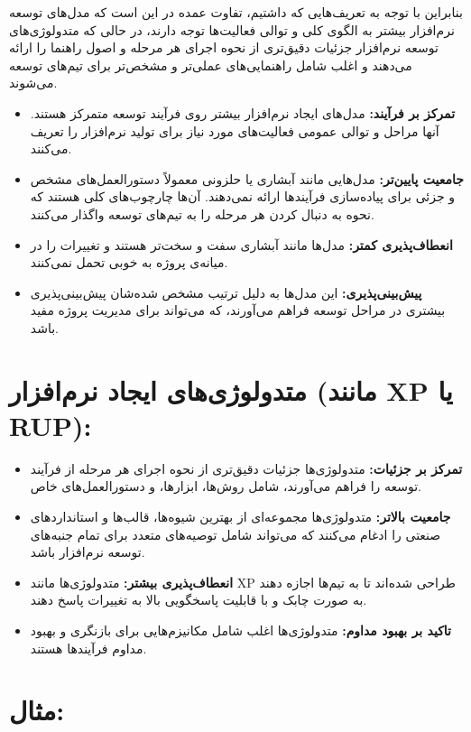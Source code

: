بنابراین با توجه به تعریف‌هایی که داشتیم، تفاوت عمده در این است که مدل‌های توسعه نرم‌افزار بیشتر به الگوی کلی و توالی فعالیت‌ها توجه دارند، در حالی که متدولوژی‌های توسعه نرم‌افزار جزئیات دقیق‌تری از نحوه اجرای هر مرحله و اصول راهنما را ارائه می‌دهند و اغلب شامل راهنمایی‌های عملی‌تر و مشخص‌تر برای تیم‌های توسعه می‌شوند.

\begin{itemize}
	\item \textbf{تمرکز بر فرآیند:} مدل‌های ایجاد نرم‌افزار بیشتر روی فرآیند توسعه متمرکز هستند. آنها مراحل و توالی عمومی فعالیت‌های مورد نیاز برای تولید نرم‌افزار را تعریف می‌کنند.
	\item \textbf{جامعیت پایین‌تر:} مدل‌هایی مانند آبشاری یا حلزونی معمولاً دستورالعمل‌های مشخص و جزئی برای پیاده‌سازی فرآیندها ارائه نمی‌دهند. آن‌ها چارچوب‌های کلی هستند که نحوه به دنبال کردن هر مرحله را به تیم‌های توسعه واگذار می‌کنند.
	\item \textbf{انعطاف‌پذیری کمتر:} مدل‌ها مانند آبشاری سفت و سخت‌تر هستند و تغییرات را در میانه‌ی پروژه به خوبی تحمل نمی‌کنند.
	\item \textbf{پیش‌بینی‌پذیری:} این مدل‌ها به دلیل ترتیب مشخص شده‌شان پیش‌بینی‌پذیری بیشتری در مراحل توسعه فراهم می‌آورند، که می‌تواند برای مدیریت پروژه مفید باشد.
\end{itemize}

\section*{متدولوژی‌های ایجاد نرم‌افزار (مانند XP یا RUP):}

\begin{itemize}
	\item \textbf{تمرکز بر جزئیات:} متدولوژی‌ها جزئیات دقیق‌تری از نحوه اجرای هر مرحله از فرآیند توسعه را فراهم می‌آورند، شامل روش‌ها، ابزارها، و دستورالعمل‌های خاص.
	\item \textbf{جامعیت بالاتر:} متدولوژی‌ها مجموعه‌ای از بهترین شیوه‌ها، قالب‌ها و استانداردهای صنعتی را ادغام می‌کنند که می‌تواند شامل توصیه‌های متعدد برای تمام جنبه‌های توسعه نرم‌افزار باشد.
	\item \textbf{انعطاف‌پذیری بیشتر:} متدولوژی‌ها مانند XP طراحی شده‌اند تا به تیم‌ها اجازه دهند به صورت چابک و با قابلیت پاسخگویی بالا به تغییرات پاسخ دهند.
	\item \textbf{تاکید بر بهبود مداوم:} متدولوژی‌ها اغلب شامل مکانیزم‌هایی برای بازنگری و بهبود مداوم فرآیندها هستند.
\end{itemize}

\section*{مثال:}

